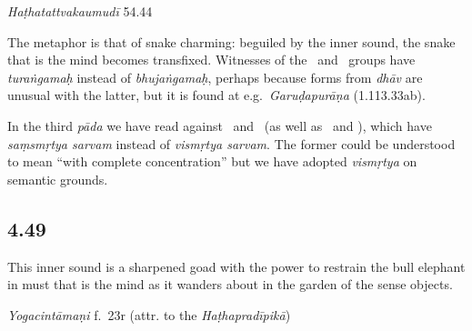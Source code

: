 \begin{ekdosis}
\begin{testimonia}[hp04_048]
\emph{Haṭhatattvakaumudī} 54.44
\begin{versinnote}
\end{versinnote}
\end{testimonia}

\begin{philcomm}[hp04_048]
The metaphor is that of snake charming: beguiled by the inner sound, the snake that is the mind becomes transfixed. Witnesses of the \textgamma \ and \textdelta \ groups have \emph{turaṅgamaḥ} instead of \emph{bhujaṅgamaḥ}, perhaps because forms from \emph{dhāv} are unusual with the latter, but it is found at e.g.~\emph{Garuḍapurāṇa} (1.113.33ab).\lb

In the third \emph{pāda} we have read against \alphaOne\ and \alphaTwo\ (as well as \betaTwo\ and \epsilonOne), which have \emph{saṃsmṛtya sarvam} instead of \emph{vismṛtya sarvam}. The former could be understood to mean “with complete concentration” but we have adopted \emph{vismṛtya} on semantic grounds.
\end{philcomm}

\subsection*{4.49}
\begin{translation}[hp04_049]
This inner sound is a sharpened goad with the power to restrain the bull elephant in must that is the mind as it wanders about in the garden of the sense objects.
\end{translation} %


\begin{testimonia}[hp04_049]
\emph{Yogacintāmaṇi} f.~23r (attr. to the \emph{Haṭhapradīpikā})
\begin{versinnote}
\end{versinnote}


\end{testimonia}
\end{ekdosis}
